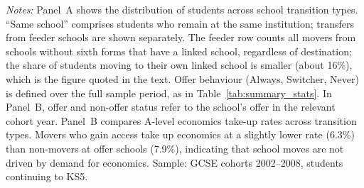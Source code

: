 \begin{table}[htbp]
\begin{tabular}{l cccc}
\bottomrule
\end{tabular}
\begin{minipage}{\textwidth}
\smallskip
\footnotesize
\textit{Notes:} Panel~A shows the distribution of students across school transition types. ``Same school'' comprises students who remain at the same institution; transfers from feeder schools are shown separately. The feeder row counts all movers from schools without sixth forms that have a linked school, regardless of destination; the share of students moving to their own linked school is smaller (about 16\%), which is the figure quoted in the text. Offer behaviour (Always, Switcher, Never) is defined over the full sample period, as in Table~\ref{tab:summary_stats}. In Panel~B, offer and non-offer status refer to the school's offer in the relevant cohort year. Panel~B compares A-level economics take-up rates across transition types. Movers who gain access take up economics at a slightly lower rate (6.3\%) than non-movers at offer schools (7.9\%), indicating that school moves are not driven by demand for economics. Sample: GCSE cohorts 2002--2008, students continuing to KS5.
\end{minipage}
\end{table}
